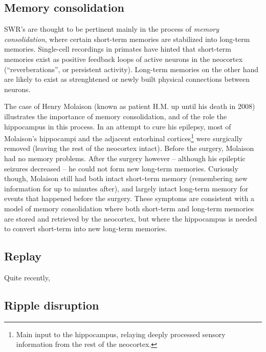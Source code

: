 \subsection{Memory consolidation}

SWR's are thought to be pertinent mainly in the process of \emph{memory consolidation}, where certain short-term memories are stabilized into long-term memories. Single-cell recordings in primates have hinted that short-term memories exist as positive feedback loops of active neurons in the neocortex (``reverberations'', or persistent activity). Long-term memories on the other hand are likely to exist as strenghtened or newly built physical connections between neurons. \cite{Kandel2013,Bear2015}

The case of Henry Molaison (known as patient H.M. up until his death in 2008) illustrates the importance of memory consolidation, and of the role the hippocampus in this process. In an attempt to cure his epilepsy, most of Molaison's hippocampi and the adjacent entorhinal cortices\footnote{Main input to the hippocampus, relaying deeply processed sensory information from the rest of the neocortex.} were surgically removed (leaving the rest of the neocortex intact). Before the surgery, Molaison had no memory problems. After the surgery however -- although his epileptic seizures decreased -- he could not form new long-term memories.\footnotemark{} Curiously though, Molaison still had both intact short-term memory (remembering new information for up to minutes after), and largely intact long-term memory for events that happened before the surgery. These symptoms are consistent with a model of memory consolidation where both short-term and long-term memories are stored and retrieved by the neocortex, but where the hippocampus is needed to convert short-term into new long-term memories. \cite{Kandel2013}







\subsection{Replay}

Quite recently, 




\subsection{Ripple disruption}


